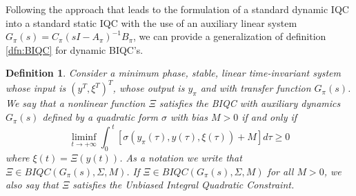 \documentclass[letterpaper,10pt,conference,twocolumn]{IEEEtran}
\newtheorem{dfn}{Definition}
\newcommand{\csi}{\xi}
\begin{document}
Following the approach that leads to the formulation of a standard dynamic IQC into a standard static IQC with the use of an auxiliary linear system $G_{\pi}(s)=C_{\pi}(sI-A_{\pi})^{-1}B_{\pi}$, we can provide a generalization of definition \ref{dfn:BIQC} for dynamic BIQC's.
\begin{dfn}
	Consider a minimum phase, stable, linear time-invariant system whose input is $(y^T, \csi^T)^T$, whose output is $y_{\pi}$ and with transfer function $G_{\pi}(s)$.
	We say that a nonlinear function $\Xi$ satisfies the BIQC with auxiliary dynamics $G_{\pi}(s)$ defined by a quadratic form $\sigma$ with bias $M>0$ if and only if
	\begin{equation*}
		\liminf_{t\rightarrow +\infty}
			\int_0^{~t}[\sigma(y_{\pi}(\tau),y(\tau),\xi(\tau)) + M ]d\tau\geq 0
	\end{equation*}
	where $\xi(t)=\Xi(y(t))$.
	As a notation we write that $\Xi \in BIQC(G_{\pi}(s),\Sigma,M)$. If $\Xi \in BIQC(G_{\pi}(s),\Sigma,M)$ for all $M>0$, we also say that $\Xi$ satisfies the Unbiased Integral Quadratic Constraint.
\end{dfn}
\end{document}
